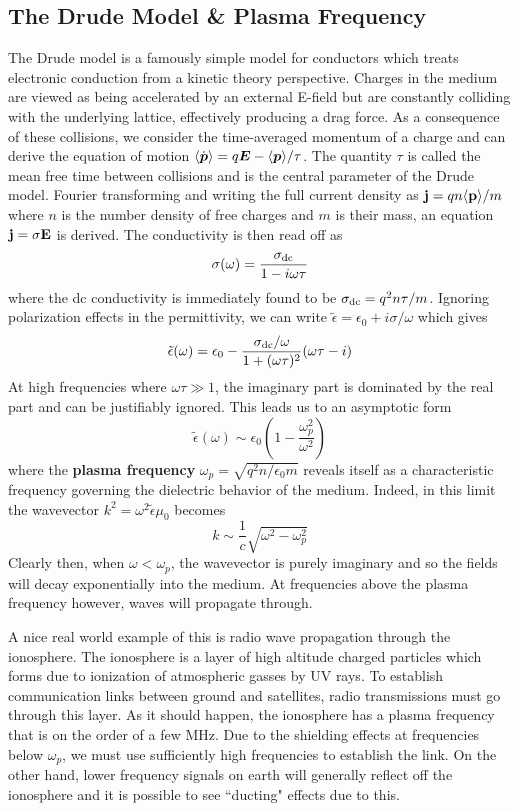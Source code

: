 \documentclass[twocolumn]{gwclass}
\newcommand{\bt}[1]{\text{\textbf{#1}}}
\begin{document}
	
	\subsection{The Drude Model \& Plasma Frequency}
	The Drude model is a famously simple model for conductors which treats electronic conduction from a kinetic theory perspective. Charges in the medium are viewed as being accelerated by an external E-field but are constantly colliding with the underlying lattice, effectively producing a drag force. As a consequence of these collisions, we consider the time-averaged momentum of a charge and can derive the equation of motion $\langle \dot{\boldsymbol{p}}\rangle = q\boldsymbol{E} - \langle \boldsymbol{p}\rangle /\tau$. The quantity $\tau$ is called the mean free time between collisions and is the central parameter of the Drude model. Fourier transforming and writing the full current density as $\bt{j}= qn\langle \bt{p}\rangle/m$ where $n$ is the number density of free charges and $m$ is their mass, an equation $\bt{j} = \sigma \bt{E}$ is derived. The conductivity is then read off as
	$$ \sigma(\omega) = \frac{\sigma_{\text{\normalfont{dc}}}}{1 - i\omega\tau} $$
	where the dc conductivity is immediately found to be $\sigma_{\text{\normalfont{dc}}}=q^2n\tau/m$. Ignoring polarization effects in the permittivity, we can write $\tilde{\epsilon} = \epsilon_0 + i\sigma/\omega$ which gives
	$$ \tilde{\epsilon}(\omega) = \epsilon_0 - \frac{\sigma_{\text{\normalfont{dc}}}/\omega}{1 + (\omega\tau)^2}(\omega\tau - i)$$
	At high frequencies where $\omega\tau \gg 1$, the imaginary part is dominated by the real part and can be justifiably ignored. This leads us to an asymptotic form
	$$ \tilde{\epsilon}(\omega) \sim \epsilon_0\left(1 - \frac{\omega_p^2}{\omega^2}\right)$$
	where the \textbf{plasma frequency} $\omega_p =\sqrt{q^2n/\epsilon_0m}$ reveals itself as a characteristic frequency governing the dielectric behavior of the medium. Indeed, in this limit the wavevector $k^2=\omega^2\tilde{\epsilon}\mu_0$ becomes
	$$ k \sim \frac{1}{c}\sqrt{\omega^2 - \omega_p^2} $$
	Clearly then, when $\omega < \omega_p$, the wavevector is purely imaginary and so the fields will decay exponentially into the medium. At frequencies above the plasma frequency however, waves will propagate through. 
	
	A nice real world example of this is radio wave propagation through the ionosphere. The ionosphere is a layer of high altitude charged particles which forms due to ionization of atmospheric gasses by UV rays. To establish communication links between ground and satellites, radio transmissions must go through this layer. As it should happen, the ionosphere has a plasma frequency that is on the order of a few MHz. Due to the shielding effects at frequencies below $\omega_p$, we must use sufficiently high frequencies to establish the link. On the other hand, lower frequency signals on earth will generally reflect off the ionosphere and it is possible to see ``ducting" effects due to this.
\end{document}
